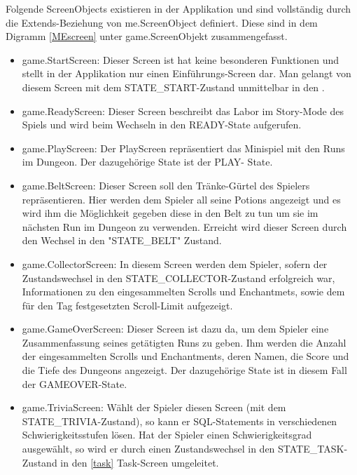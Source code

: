 Folgende ScreenObjects existieren in der Applikation und sind vollst\"andig durch die Extends-Beziehung von me.ScreenObject
definiert. Diese sind in dem Digramm \ref {MEscreen} unter game.ScreenObjekt zusammengefasst.

\begin{itemize}
         \item game.StartScreen: Dieser Screen ist hat keine besonderen Funktionen und stellt in der Applikation nur einen 
                  Einf\"uhrungs-Screen dar. Man gelangt von diesem Screen mit dem STATE\_START-Zustand unmittelbar in den .
         \item game.ReadyScreen: Dieser Screen beschreibt das Labor im Story-Mode des Spiels und wird beim Wechseln in den READY-State
                  aufgerufen.
         \item game.PlayScreen: Der PlayScreen repr\"asentiert das Minispiel mit den Runs im Dungeon. Der dazugeh\"orige State ist der PLAY-
                  State. 
         \item game.BeltScreen: Dieser Screen soll den Tr\"anke-G\"urtel des Spielers repr\"asentieren. Hier werden dem Spieler all seine 
                  Potions angezeigt und es wird ihm die M\"oglichkeit gegeben diese in den Belt zu tun um sie im n\"achsten Run im Dungeon
                  zu verwenden. Erreicht wird dieser Screen durch den Wechsel in den "STATE\_BELT" Zustand.     
         \item game.CollectorScreen: In diesem Screen werden dem Spieler, sofern der Zustandswechsel in den STATE\_COLLECTOR-Zustand 
                  erfolgreich war, Informationen zu den eingesammelten Scrolls und Enchantmets, sowie dem f\"ur den Tag festgesetzten 
                  Scroll-Limit aufgezeigt.          
         \item game.GameOverScreen: Dieser Screen ist dazu da, um dem Spieler eine Zusammenfassung seines get\"atigten Runs zu geben.
                  Ihm werden die Anzahl der eingesammelten Scrolls und Enchantments, deren Namen, die Score und die Tiefe des Dungeons
                  angezeigt. Der dazugeh\"orige State ist in diesem Fall der GAMEOVER-State.
   	 \item game.TriviaScreen: W\"ahlt der Spieler diesen Screen (mit dem STATE\_TRIVIA-Zustand), so kann er SQL-Statements in 
        		  verschiedenen Schwierigkeitsstufen l\"osen. Hat der Spieler einen Schwierigkeitsgrad ausgew\"ahlt, so wird er durch einen 
       		  Zustandswechsel in den STATE\_TASK-Zustand in den \ref {task} Task-Screen umgeleitet.

\end{itemize}
